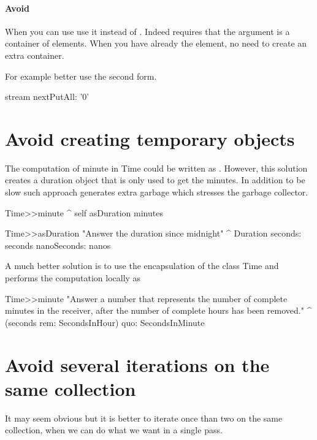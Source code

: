 \documentclass[a4paper,10pt,twoside]{book}
\begin{document}
\paragraph{Avoid }

When you can use  use it instead of . Indeed  requires that the argument is a container of elements. When you have already the element, no need to create an extra container.

For example better use the second form.
\begin{code}{}
stream nextPutAll: '0'
\end{code}



\section*{Avoid creating temporary objects}

The computation of minute in Time could be written as . However, this solution
creates a duration object that is only used to get the minutes. 
In addition to be slow such approach generates extra garbage which stresses the garbage collector.

\begin{code}{}
Time>>minute
	^ self asDuration minutes
	
Time>>asDuration
	"Answer the duration since midnight"
	^ Duration seconds: seconds nanoSeconds: nanos 	
\end{code}

A much better solution is to use the encapsulation of the class Time and performs the computation locally as

\begin{code}{}
Time>>minute
	"Answer a number that represents the number of complete minutes in the receiver,
	after the number of complete hours has been removed."
	^ (seconds rem: SecondsInHour) quo: SecondsInMinute 
\end{code}

\section{Avoid several iterations on the same collection}
It may seem obvious but it is better to iterate once than two on the same collection, when we can do what we want in a single pass. 
\end{document}
